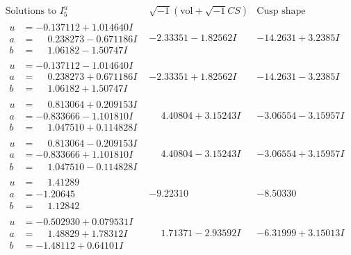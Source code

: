 \documentclass[1p]{elsarticle_modified}
\theoremstyle{definition}
\newcommand{\I}{\sqrt{-1}}
\begin{document}
$$\begin{array}{c|c|c}  
\text{Solutions to }I^u_{5}& \I (\text{vol} + \sqrt{-1}CS) & \text{Cusp shape}\\
 \hline 
\begin{aligned}
u &= -0.137112 + 1.014640 I \\
a &= \phantom{-}0.238273 - 0.671186 I \\
b &= \phantom{-}1.06182 - 1.50747 I\end{aligned}
 & -2.33351 - 1.82562 I & -14.2631 + 3.2385 I \\ \hline\begin{aligned}
u &= -0.137112 - 1.014640 I \\
a &= \phantom{-}0.238273 + 0.671186 I \\
b &= \phantom{-}1.06182 + 1.50747 I\end{aligned}
 & -2.33351 + 1.82562 I & -14.2631 - 3.2385 I \\ \hline\begin{aligned}
u &= \phantom{-}0.813064 + 0.209153 I \\
a &= -0.833666 - 1.101810 I \\
b &= \phantom{-}1.047510 + 0.114828 I\end{aligned}
 & \phantom{-}4.40804 + 3.15243 I & -3.06554 - 3.15957 I \\ \hline\begin{aligned}
u &= \phantom{-}0.813064 - 0.209153 I \\
a &= -0.833666 + 1.101810 I \\
b &= \phantom{-}1.047510 - 0.114828 I\end{aligned}
 & \phantom{-}4.40804 - 3.15243 I & -3.06554 + 3.15957 I \\ \hline\begin{aligned}
u &= \phantom{-}1.41289\phantom{ +0.000000I} \\
a &= -1.20645\phantom{ +0.000000I} \\
b &= \phantom{-}1.12842\phantom{ +0.000000I}\end{aligned}
 & -9.22310\phantom{ +0.000000I} & -8.50330\phantom{ +0.000000I} \\ \hline\begin{aligned}
u &= -0.502930 + 0.079531 I \\
a &= \phantom{-}1.48829 + 1.78312 I \\
b &= -1.48112 + 0.64101 I\end{aligned}
 & \phantom{-}1.71371 - 2.93592 I & -6.31999 + 3.15013 I \\ \hline\begin{aligned}

\end{aligned}
\end{array}$$
\end{document}

